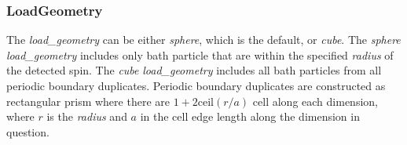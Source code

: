 \documentclass{book}
\begin{document}
\subsubsection{LoadGeometry} %
The \textit{load\_geometry} can be either \textit{sphere}, 
which is the default, or \textit{cube}.  The \textit{sphere} 
\textit{load\_geometry} includes only bath particle that are within the
specified \textit{radius} of the detected spin.  The \textit{cube} 
\textit{load\_geometry} includes all bath particles from all periodic 
boundary duplicates.  
Periodic boundary duplicates are constructed as rectangular prism where there
are $1 + 2\text{ceil}(r/a)$ cell along each dimension, 
where $r$ is the \textit{radius} and $a$ in the cell edge length along the
dimension in question. 
\end{document}
